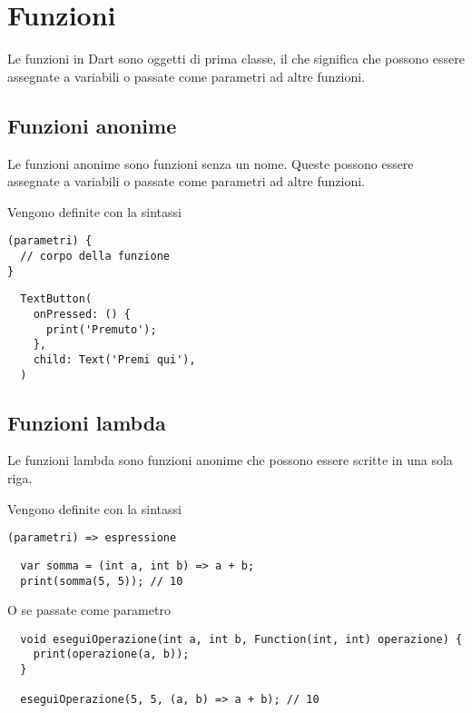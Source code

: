 \documentclass[12pt]{article}
\begin{document}
\section{Funzioni}
Le funzioni in Dart sono oggetti di prima classe, il che significa che possono essere assegnate a variabili o passate come parametri ad altre funzioni.

\subsection{Funzioni anonime}
Le funzioni anonime sono funzioni senza un nome.
Queste possono essere assegnate a variabili o passate come parametri ad altre funzioni.

Vengono definite con la sintassi 
\begin{highlight}
\begin{verbatim}
(parametri) {
  // corpo della funzione
}
\end{verbatim}
\end{highlight}

\begin{verbatim}
  TextButton(
    onPressed: () {
      print('Premuto');
    },
    child: Text('Premi qui'),
  )
\end{verbatim}

\subsection{Funzioni lambda}
Le funzioni lambda sono funzioni anonime che possono essere scritte in una sola riga. 

Vengono definite con la sintassi
\begin{highlight}
\begin{verbatim}  
(parametri) => espressione
\end{verbatim}
\end{highlight}

\begin{verbatim}
  var somma = (int a, int b) => a + b;
  print(somma(5, 5)); // 10
\end{verbatim}
O se passate come parametro
\begin{verbatim}
  void eseguiOperazione(int a, int b, Function(int, int) operazione) {
    print(operazione(a, b));
  }

  eseguiOperazione(5, 5, (a, b) => a + b); // 10
\end{verbatim}
\end{document}
